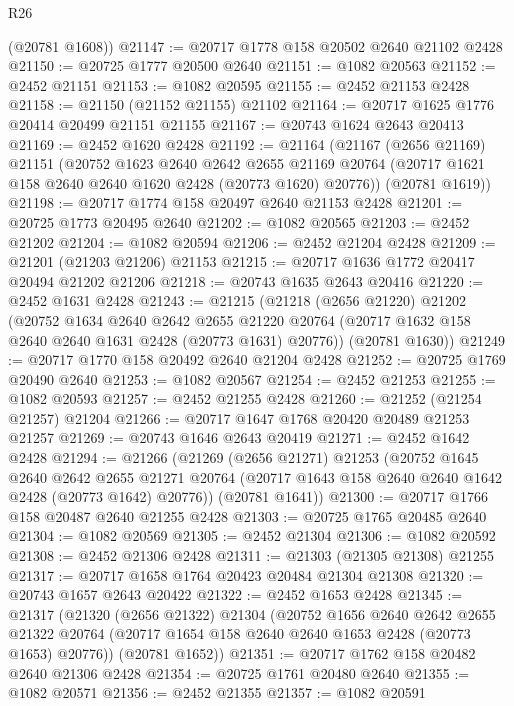 \begin{lexlean}{R26}
\begin{coremodule}
      (@20781 @1608))
@21147 := @20717 @1778 @158 @20502 @2640 @21102 @2428
@21150 := @20725 @1777 @20500 @2640
@21151 := @1082 @20563
@21152 := @2452 @21151
@21153 := @1082 @20595
@21155 := @2452 @21153 @2428
@21158 := @21150 (@21152 @21155) @21102
@21164 := @20717 @1625 @1776 @20414 @20499 @21151 @21155
@21167 := @20743 @1624 @2643 @20413
@21169 := @2452 @1620 @2428
@21192 := @21164
    (@21167
      (@2656 @21169)
      @21151
      (@20752
        @1623
        @2640
        @2642
        @2655
        @21169
        @20764
        (@20717 @1621 @158 @2640 @2640 @1620 @2428 (@20773 @1620) @20776))
      (@20781 @1619))
@21198 := @20717 @1774 @158 @20497 @2640 @21153 @2428
@21201 := @20725 @1773 @20495 @2640
@21202 := @1082 @20565
@21203 := @2452 @21202
@21204 := @1082 @20594
@21206 := @2452 @21204 @2428
@21209 := @21201 (@21203 @21206) @21153
@21215 := @20717 @1636 @1772 @20417 @20494 @21202 @21206
@21218 := @20743 @1635 @2643 @20416
@21220 := @2452 @1631 @2428
@21243 := @21215
    (@21218
      (@2656 @21220)
      @21202
      (@20752
        @1634
        @2640
        @2642
        @2655
        @21220
        @20764
        (@20717 @1632 @158 @2640 @2640 @1631 @2428 (@20773 @1631) @20776))
      (@20781 @1630))
@21249 := @20717 @1770 @158 @20492 @2640 @21204 @2428
@21252 := @20725 @1769 @20490 @2640
@21253 := @1082 @20567
@21254 := @2452 @21253
@21255 := @1082 @20593
@21257 := @2452 @21255 @2428
@21260 := @21252 (@21254 @21257) @21204
@21266 := @20717 @1647 @1768 @20420 @20489 @21253 @21257
@21269 := @20743 @1646 @2643 @20419
@21271 := @2452 @1642 @2428
@21294 := @21266
    (@21269
      (@2656 @21271)
      @21253
      (@20752
        @1645
        @2640
        @2642
        @2655
        @21271
        @20764
        (@20717 @1643 @158 @2640 @2640 @1642 @2428 (@20773 @1642) @20776))
      (@20781 @1641))
@21300 := @20717 @1766 @158 @20487 @2640 @21255 @2428
@21303 := @20725 @1765 @20485 @2640
@21304 := @1082 @20569
@21305 := @2452 @21304
@21306 := @1082 @20592
@21308 := @2452 @21306 @2428
@21311 := @21303 (@21305 @21308) @21255
@21317 := @20717 @1658 @1764 @20423 @20484 @21304 @21308
@21320 := @20743 @1657 @2643 @20422
@21322 := @2452 @1653 @2428
@21345 := @21317
    (@21320
      (@2656 @21322)
      @21304
      (@20752
        @1656
        @2640
        @2642
        @2655
        @21322
        @20764
        (@20717 @1654 @158 @2640 @2640 @1653 @2428 (@20773 @1653) @20776))
      (@20781 @1652))
@21351 := @20717 @1762 @158 @20482 @2640 @21306 @2428
@21354 := @20725 @1761 @20480 @2640
@21355 := @1082 @20571
@21356 := @2452 @21355
@21357 := @1082 @20591

\end{coremodule}
\end{lexlean}
